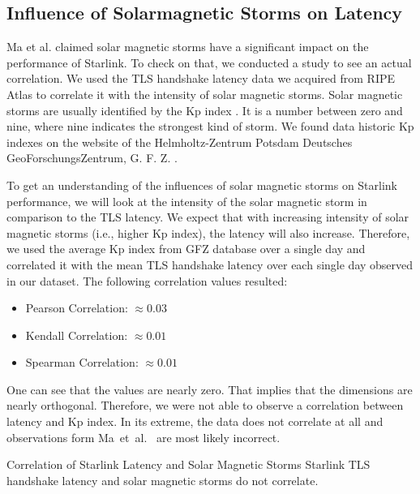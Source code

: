 \subsection{Influence of Solarmagnetic Storms on Latency}
\label{sec:solarmagnetic-storms}

Ma et al. \cite{DBLP:conf/infocom/MaCZCML23} claimed solar magnetic storms have
a significant impact on the performance of Starlink. To check on that, we
conducted a study to see an actual correlation. We used the TLS handshake
latency data we acquired from RIPE Atlas to correlate it with the intensity of
solar magnetic storms. Solar magnetic storms are usually identified by the Kp
index \cite{Bartels1957}. It is a number between zero and nine, where nine
indicates the strongest kind of storm. We found data historic Kp indexes on the
website of the Helmholtz-Zentrum Potsdam Deutsches GeoForschungsZentrum, G. F.
Z. \cite{GFZ2023}.

To get an understanding of the influences of solar magnetic storms on Starlink
performance, we will look at the intensity of the solar magnetic storm in
comparison to the TLS latency. We expect that with increasing intensity of
solar magnetic storms (i.e., higher Kp index), the latency will also increase.
Therefore, we used the average Kp index from GFZ database over a single day and
correlated it with the mean TLS handshake latency over each single day observed
in our dataset. The following correlation values resulted:

\begin{itemize}
	\item Pearson Correlation: $\approx 0.03$
	\item Kendall Correlation: $\approx 0.01$
	\item Spearman Correlation: $\approx 0.01$
\end{itemize}

One can see that the values are nearly zero. That implies that the dimensions
are nearly orthogonal. Therefore, we were not able to observe a correlation
between latency and Kp index. In its extreme, the data does not correlate at
all and observations form Ma~et~al.~\cite{DBLP:conf/infocom/MaCZCML23} are most
likely incorrect.

\begin{takeaway}{Correlation of Starlink Latency and Solar Magnetic Storms}
	Starlink TLS handshake latency and solar magnetic storms do not
	correlate.
\end{takeaway}

